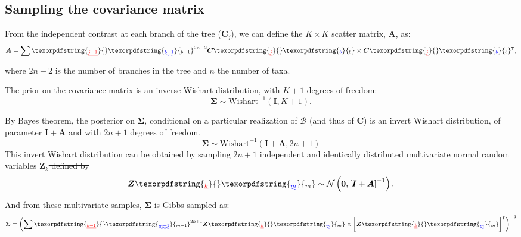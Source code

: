 \documentclass{article}
\newcommand{\MultiplyMatrix}{\times}
\newcommand{\UniDimArray}[1]{\bm{#1}}
\newcommand{\BiDimArray}[1]{\bm{#1}}
\newcommand{\tr}{^{\intercal}}
\newcommand{\inv}{^{-1}}
\newcommand{\Branch}{b} %
\newcommand{\WishartIDD}{m} %
\newcommand{\NbrTaxa}{n}
\newcommand{\VecZero}{\UniDimArray{0}}
\newcommand{\Nbranch}{2 \NbrTaxa - 2}
\newcommand{\WishartPostDf}{2 \NbrTaxa + 1}
\newcommand{\Ntrait}{K}
\newcommand{\contrast}{\UniDimArray{C}}
\newcommand{\Covariancematrix}{\Sigma}
\newcommand{\CovarianceMatrix}{\BiDimArray{\Covariancematrix}}
\newcommand{\Identitymatrix}{\BiDimArray{I}}
\newcommand{\brownian}{\mathcal{B}}
\newcommand{\Brownian}{\UniDimArray{\brownian}}
\newcommand{\Scattermatrix}{\BiDimArray{A}}
\newcommand{\Multivariate}{\UniDimArray{Z}}
\providecommand{\DIFaddtex}[1]{{\protect\color{blue}\uwave{#1}}} %
\providecommand{\DIFdeltex}[1]{{\protect\color{red}\sout{#1}}}                      %
\providecommand{\DIFaddbegin}{} %
\providecommand{\DIFaddend}{} %
\providecommand{\DIFdelbegin}{} %
\providecommand{\DIFdelend}{} %
\providecommand{\DIFadd}[1]{\texorpdfstring{\DIFaddtex{#1}}{#1}} %
\providecommand{\DIFdel}[1]{\texorpdfstring{\DIFdeltex{#1}}{}} %
\newcommand{\DIFscaledelfig}{0.5}
\newlength{\DIFdelgraphicswidth} %
\newlength{\DIFdelgraphicsheight} %
\newcommand{\DIFaddincludegraphics}[2][]{{\color{blue}\fbox{\DIFOincludegraphics[#1]{#2}}}} %
\newcommand{\DIFdelincludegraphics}[2][]{%
\sbox{\DIFdelgraphicsbox}{\DIFOincludegraphics[#1]{#2}}%
\settoboxwidth{\DIFdelgraphicswidth}{\DIFdelgraphicsbox} %
\settoboxtotalheight{\DIFdelgraphicsheight}{\DIFdelgraphicsbox} %
\scalebox{\DIFscaledelfig}{%
\parbox[b]{\DIFdelgraphicswidth}{\usebox{\DIFdelgraphicsbox}\\[-\baselineskip] \rule{\DIFdelgraphicswidth}{0em}}\llap{\resizebox{\DIFdelgraphicswidth}{\DIFdelgraphicsheight}{%
\setlength{\unitlength}{\DIFdelgraphicswidth}%
\begin{picture}(1,1)%
\thicklines\linethickness{2pt} %
{\color[rgb]{1,0,0}\put(0,0){\framebox(1,1){}}}%
{\color[rgb]{1,0,0}\put(0,0){\line( 1,1){1}}}%
{\color[rgb]{1,0,0}\put(0,1){\line(1,-1){1}}}%
\end{picture}%
}\hspace*{3pt}}} %
} %
\DeclareRobustCommand{\DIFaddbegin}{\DIFOaddbegin \let\includegraphics\DIFaddincludegraphics} %
\DeclareRobustCommand{\DIFaddend}{\DIFOaddend \let\includegraphics\DIFOincludegraphics} %
\DeclareRobustCommand{\DIFdelbegin}{\DIFOdelbegin \let\includegraphics\DIFdelincludegraphics} %
\DeclareRobustCommand{\DIFdelend}{\DIFOaddend \let\includegraphics\DIFOincludegraphics} %
\begin{document}
\subsection{Sampling the covariance matrix}\label{subsec:sampling-the-covariance-matrix}
From the independent contrast at each branch of the tree (\DIFdelbegin \DIFdel{$\contrast_{j}$}\DIFdelend \DIFaddbegin \DIFadd{$\contrast_{\Branch}$}\DIFaddend ), we can define the $\Ntrait \times \Ntrait$ scatter matrix, $\Scattermatrix$, as:
\begin{equation}
    \Scattermatrix = \sum\limits\DIFdelbegin \DIFdel{_{j=1}}\DIFdelend \DIFaddbegin \DIFadd{_{\Branch=1}}\DIFaddend ^{\Nbranch} \contrast\DIFdelbegin \DIFdel{_{j} }\DIFdelend \DIFaddbegin \DIFadd{_{\Branch} }\DIFaddend \MultiplyMatrix \DIFdelbegin %
\DIFdelend \contrast\DIFdelbegin \DIFdel{_{j}}%
\DIFdelend \DIFaddbegin \DIFadd{_{\Branch}}\DIFaddend \tr\label{eq:bayes-scatter},
\end{equation}
where $\Nbranch$ is the number of branches in the tree and $\NbrTaxa$ the number of taxa.

The {prior} on the covariance matrix is an inverse Wishart distribution, with $\Ntrait + 1$ degrees of freedom:
\begin{equation}
    \label{eq:Distribcovariance}
    \CovarianceMatrix \sim \text{Wishart}^{-1} (\Identitymatrix, \Ntrait + 1).
\end{equation}

By Bayes theorem, the {posterior} on $\CovarianceMatrix$, conditional on a particular realization of $\Brownian$ (and thus of $\contrast$) is an invert Wishart distribution, of parameter $\Identitymatrix + \Scattermatrix$ and with $\WishartPostDf$ degrees of freedom.
\begin{equation}
    \CovarianceMatrix \sim \text{Wishart}^{-1}\left( \Identitymatrix + \Scattermatrix, \WishartPostDf\right)\label{eq:bayes-posterior}
\end{equation}
This invert Wishart distribution can be obtained by sampling $\WishartPostDf$ independent and identically distributed multivariate normal random variables \DIFdelbegin \DIFdel{$\Multivariate_{k}$ defined by
}\DIFdelend \DIFaddbegin \DIFadd{$\Multivariate_{\WishartIDD}$ defined by
}\DIFaddend \begin{equation}
    \Multivariate\DIFdelbegin \DIFdel{_{k} }\DIFdelend \DIFaddbegin \DIFadd{_{\WishartIDD} }\DIFaddend \sim \mathcal{N} \left( \VecZero, \left[ \Identitymatrix + \Scattermatrix\right]^{-1} \right).\label{eq:bayes-multivariate}
\end{equation}
And from these multivariate samples, $\CovarianceMatrix$ is Gibbs sampled as:
\begin{equation}
    \CovarianceMatrix = \left( \sum\limits\DIFdelbegin \DIFdel{_{k=1}}\DIFdelend \DIFaddbegin \DIFadd{_{\WishartIDD=1}}\DIFaddend ^{\WishartPostDf} \Multivariate\DIFdelbegin \DIFdel{_{k} }\DIFdelend \DIFaddbegin \DIFadd{_{\WishartIDD} }\DIFaddend \MultiplyMatrix  \left[\Multivariate\DIFdelbegin \DIFdel{_{k} }\DIFdelend \DIFaddbegin \DIFadd{_{\WishartIDD} }\DIFaddend \right] \tr \right)\inv \label{eq:bayes-gibbs}
\end{equation}
\end{document}
